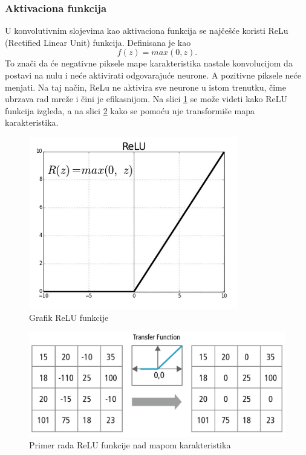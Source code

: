 \documentclass[a4paper]{article}
\begin{document}
\subsubsection{Aktivaciona funkcija}
\label{aktivaciona_funkcija}

U konvolutivnim slojevima kao aktivaciona funkcija se najčešće koristi ReLu (Rectified Linear Unit) funkcija. Definisana je kao $$ f(z) = max(0, z). $$ To znači da će negativne piksele mape karakteristika nastale konvolucijom da postavi na nulu i neće aktivirati odgovarajuće neurone. A pozitivne piksele neće menjati. Na taj način, ReLu ne aktivira sve neurone u istom trenutku, čime ubrzava rad mreže i čini je efikasnijom. Na slici \ref{fig:relu_fja} se može videti kako ReLU funkcija izgleda, a na slici \ref{fig:relu_transform} kako se pomoću nje transformiše mapa karakteristika.

\begin{figure}[h!]
\begin{center}
\includegraphics[scale=0.38]{relu2.png}
\end{center}
\caption{Grafik ReLU funkcije}
\label{fig:relu_fja}
\end{figure}


\begin{figure}[h!]
\begin{center}
\includegraphics[scale=0.20]{relu1.jpg}
\end{center}
\caption{Primer rada ReLU funkcije nad mapom karakteristika}
\label{fig:relu_transform}
\end{figure}
\end{document}
